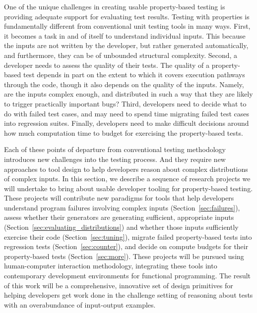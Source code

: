 One of the unique challenges in creating usable property-based testing is
providing adequate support for evaluating test results. Testing with properties
is fundamentally different from conventional unit testing tools in many ways.
First, it becomes a task in and of itself to understand individual inputs. This
because the inputs are not written by the developer, but rather generated
automatically, and furthermore, they can be of unbounded structural complexity.
Second, a developer needs to assess the quality of their tests. The quality of a
property-based test depends in part on the extent to which it covers execution
pathways through the code, though it also depends on the quality of the inputs.
Namely, are the inputs complex enough, and distributed in such a way that they
are likely to trigger practically important bugs? Third, developers need to
decide what to do with failed test cases, and may need to spend time migrating
failed test cases into regression suites. Finally, developers need to make
difficult decisions around how much computation time to budget for exercising
the property-based tests.

Each of these points of departure from conventional testing methodology
introduces new challenges into the testing process. And they require new
approaches to tool design to help developers reason about complex distributions
of complex inputs. In this section, we describe a sequence of research projects
we will undertake to bring about usable developer tooling for property-based
testing. These projects will contribute new paradigms for tools that help
developers understand program failures involving complex inputs
(Section~\ref{sec:failures}), assess whether their generators are generating
sufficient, appropriate inputs (Section~\ref{sec:evaluating_distributions}) and
whether those inputs sufficiently exercise their code
(Section~\ref{sec:tuning}), migrate failed property-based tests into regression
tests (Section~\ref{sec:counter}), and decide on compute budgets for their
property-based tests (Section~\ref{sec:more}). These projects will be pursued
using human-computer interaction methodology, integrating these tools into
contemporary development environments for functional programming. The result of
this work will be a comprehensive, innovative set of design primitives for
helping developers get work done in the challenge setting of reasoning about
tests with an overabundance of input-output examples.


